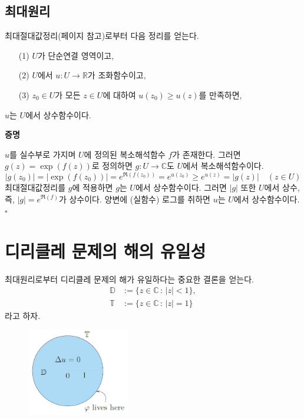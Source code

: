 \subsection{최대원리}

최대절대값정리(\pageref{sec-4-6}페이지 참고)로부터 %
다음 정리를 얻는다.

\begin{salttheorem} [최대원리] {}{} \label{thm-5-4}

\begin{itemize}
\item[(1)] $U$가 단순연결 영역이고,
\item[(2)] $U$에서 $u:U\to\mathbb R$가 조화함수이고,
\item[(3)] $z_0\in U$가 모든 $z\in U$에 대하여 $u(z_0) \ge u(z)$를 만족하면,
\end{itemize}
$u$는 $U$에서 상수함수이다.
\end{salttheorem}

{\bf 증명}

$u$를 실수부로 가지며 $U$에 정의된 복소해석함수 $f$가 존재한다.
그러면 $g(z)=\exp(f(z))$로 정의하면
$g:U\to\mathbb C$도 $U$에서 복소해석함수이다.
\[
|g(z_0)| = |\exp(f(z_0))| = e^{\Re(f(z_0))}
= e^{u(z_0)} \ge e^{u(z)} = |g(z)|
\quad (z\in U)
\]
최대절대값정리를 $g$에 적용하면
$g$는 $U$에서 상수함수이다.
그러면 $|g|$ 또한 $U$에서 상수, 즉, $|g| = e^{\Re(f)}$가 상수이다.
양변에 (실함수) 로그를 취하면 $u$는  $U$에서 상수함수이다.
\hfill $\square$

\section{디리클레 문제의 해의 유일성}

최대원리로부터 디리클레 문제의 해가 유일하다는 중요한 결론을 얻는다.
\begin{align*}
\mathbb D&:= \{ z\in\mathbb C\,:\, |z|<1\},\\
\mathbb T&:= \{ z\in\mathbb C\,:\, |z|=1\}
\end{align*}
라고 하자.

\begin{figure}[h!]
\begin{center}
\includegraphics[width=0.4\textwidth]{./SaltChapter/figs/fig-5-0-2}
\end{center}
\end{figure}

